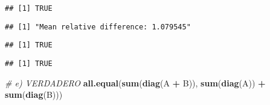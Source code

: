 \documentclass[]{article}
\newenvironment{Shaded}{\begin{snugshade}}{\end{snugshade}}
\newcommand{\CommentTok}[1]{\textcolor[rgb]{0.56,0.35,0.01}{\textit{#1}}}
\newcommand{\KeywordTok}[1]{\textcolor[rgb]{0.13,0.29,0.53}{\textbf{#1}}}
\newcommand{\NormalTok}[1]{#1}
\newcommand{\OperatorTok}[1]{\textcolor[rgb]{0.81,0.36,0.00}{\textbf{#1}}}
\newcommand{\StringTok}[1]{\textcolor[rgb]{0.31,0.60,0.02}{#1}}
\begin{document}
\begin{verbatim}
## [1] TRUE
\end{verbatim}

\begin{Shaded}
\end{Shaded}

\begin{verbatim}
## [1] "Mean relative difference: 1.079545"
\end{verbatim}

\begin{Shaded}
\end{Shaded}

\begin{verbatim}
## [1] TRUE
\end{verbatim}

\begin{Shaded}
\end{Shaded}

\begin{verbatim}
## [1] TRUE
\end{verbatim}

\begin{Shaded}
\begin{Highlighting}[]
\CommentTok{# e) VERDADERO}
\KeywordTok{all.equal}\NormalTok{(}\KeywordTok{sum}\NormalTok{(}\KeywordTok{diag}\NormalTok{(A }\OperatorTok{+}\StringTok{ }\NormalTok{B)), }\KeywordTok{sum}\NormalTok{(}\KeywordTok{diag}\NormalTok{(A)) }\OperatorTok{+}\StringTok{ }\KeywordTok{sum}\NormalTok{(}\KeywordTok{diag}\NormalTok{(B)))}
\end{Highlighting}
\end{Shaded}
\end{document}
